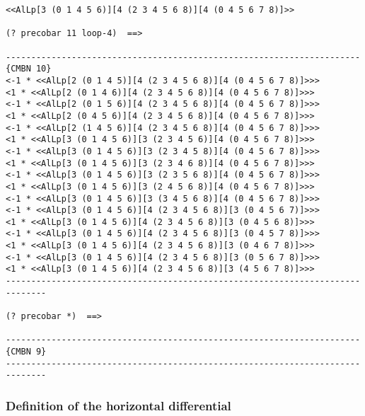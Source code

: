 {\begin{verbatim}
<<AlLp[3 (0 1 4 5 6)][4 (2 3 4 5 6 8)][4 (0 4 5 6 7 8)]>>

(? precobar 11 loop-4)  ==>

----------------------------------------------------------------------{CMBN 10}
<-1 * <<AlLp[2 (0 1 4 5)][4 (2 3 4 5 6 8)][4 (0 4 5 6 7 8)]>>>
<1 * <<AlLp[2 (0 1 4 6)][4 (2 3 4 5 6 8)][4 (0 4 5 6 7 8)]>>>
<-1 * <<AlLp[2 (0 1 5 6)][4 (2 3 4 5 6 8)][4 (0 4 5 6 7 8)]>>>
<1 * <<AlLp[2 (0 4 5 6)][4 (2 3 4 5 6 8)][4 (0 4 5 6 7 8)]>>>
<-1 * <<AlLp[2 (1 4 5 6)][4 (2 3 4 5 6 8)][4 (0 4 5 6 7 8)]>>>
<1 * <<AlLp[3 (0 1 4 5 6)][3 (2 3 4 5 6)][4 (0 4 5 6 7 8)]>>>
<-1 * <<AlLp[3 (0 1 4 5 6)][3 (2 3 4 5 8)][4 (0 4 5 6 7 8)]>>>
<1 * <<AlLp[3 (0 1 4 5 6)][3 (2 3 4 6 8)][4 (0 4 5 6 7 8)]>>>
<-1 * <<AlLp[3 (0 1 4 5 6)][3 (2 3 5 6 8)][4 (0 4 5 6 7 8)]>>>
<1 * <<AlLp[3 (0 1 4 5 6)][3 (2 4 5 6 8)][4 (0 4 5 6 7 8)]>>>
<-1 * <<AlLp[3 (0 1 4 5 6)][3 (3 4 5 6 8)][4 (0 4 5 6 7 8)]>>>
<-1 * <<AlLp[3 (0 1 4 5 6)][4 (2 3 4 5 6 8)][3 (0 4 5 6 7)]>>>
<1 * <<AlLp[3 (0 1 4 5 6)][4 (2 3 4 5 6 8)][3 (0 4 5 6 8)]>>>
<-1 * <<AlLp[3 (0 1 4 5 6)][4 (2 3 4 5 6 8)][3 (0 4 5 7 8)]>>>
<1 * <<AlLp[3 (0 1 4 5 6)][4 (2 3 4 5 6 8)][3 (0 4 6 7 8)]>>>
<-1 * <<AlLp[3 (0 1 4 5 6)][4 (2 3 4 5 6 8)][3 (0 5 6 7 8)]>>>
<1 * <<AlLp[3 (0 1 4 5 6)][4 (2 3 4 5 6 8)][3 (4 5 6 7 8)]>>>
------------------------------------------------------------------------------

(? precobar *)  ==>

----------------------------------------------------------------------{CMBN 9}
------------------------------------------------------------------------------
\end{verbatim}}
\newpage

\subsubsection {Definition of the horizontal differential}

